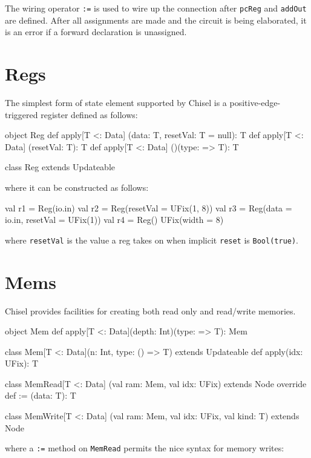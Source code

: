 \documentclass[10pt,twocolumn]{article}
\def\code#1{{\small\tt #1}}
\begin{document}
\noindent
The wiring operator
\verb!:=! is used to wire up
the connection after \verb!pcReg! and \verb!addOut! are defined.
After all assignments are made and the circuit is being elaborated, 
it is an error if a forward declaration is unassigned.

\section{Regs}

The simplest form of state element supported by Chisel is a
positive-edge-triggered register defined as follows:

\begin{scala}
object Reg {
  def apply[T <: Data]
        (data: T, resetVal: T = null): T
  def apply[T <: Data] (resetVal: T): T
  def apply[T <: Data] ()(type: => T): T
}
 
class Reg extends Updateable
\end{scala}

\noindent
where it can be constructed as follows:

\begin{scala}
val r1 = Reg(io.in)
val r2 = Reg(resetVal = UFix(1, 8))
val r3 = Reg(data = io.in, resetVal = UFix(1))
val r4 = Reg(){ UFix(width = 8) }
\end{scala}

\noindent
where \code{resetVal} is the value a reg takes on when implicit
\code{reset} is \code{Bool(true)}.

\section{Mems}

Chisel provides facilities for creating both read only and
read/write memories.  

\begin{scala}
object Mem {
  def apply[T <: Data](depth: Int)(type: => T): Mem
}

class Mem[T <: Data](n: Int, type: () => T) 
    extends Updateable {
  def apply(idx: UFix): T
}

class MemRead[T <: Data]
      (val ram: Mem, val idx: UFix) extends Node {
  override def := (data: T): T
}

class MemWrite[T <: Data]
      (val ram: Mem, val idx: UFix, val kind: T) 
    extends Node
\end{scala}

\noindent
where a \code{:=} method on \code{MemRead} permits the nice syntax for
memory writes:
\end{document}
